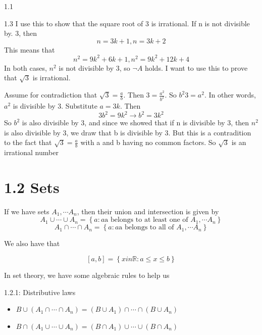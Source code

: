 \documentclass[a4paper,norsk]{article}
\renewcommand{\leq}{\leqslant}
\begin{document}
\begin{oppgavebox}{1.1}{}
\begin{enumerate}
\begin{proofbox}{1.3}{}
    I use this to show that the square root of 3 is irrational. If n is not divisible by. 3, then
    \[
        n =3k+1, n=3k+2
    \]
    This means that 
    \[
        n^2 = 9k^2+6k+1, n^2 =9k^2 + 12k + 4
    \]
    In both cases, $ n^2 $ is not divisible by 3, so $ \neg A $ holds. I want to use this to prove that $ \sqrt{ 3 } $ is irrational.

    Assume for contradiction that $ \sqrt{ 3 } = \frac{ a }{ b } $. Then $ 3 = \frac{ a^2 }{ b^2 } $. So $ b^2 3 = a^2 $. In other words, $ a^2 $ is divisible by 3. Substitute $ a = 3k $. Then
    \[
        3b^2 = 9k^2 \rightarrow b^2 = 3k^2 
    \]
    So $ b^2 $ is also divisible by 3, and since we showed that if n is divisible by 3, then $ n^2 $ is also divisible by 3, we draw that b is divisible by 3. But this is a contradition to the fact that $ \sqrt{ 3 } = \frac{ a }{ b } $  with a and b having no common factors. So $ \sqrt{ 3 } $ is an irrational number
  \end{proofbox}

  \end{enumerate}
\end{oppgavebox}



\section*{1.2 Sets}

If we have sets $ A_1,\cdots A_n $, then their union and intersection is given by  
\[
    A_1 \cup \cdots \cup A_n = \left\{ a : a \text{a belongs to at least one of } A_1, \cdots A_n  \right\} 
\]
\[
    A_1 \cap \cdots \cap A_n = \left\{ a : a \text{a belongs to all of } A_1, \cdots A_n  \right\} 
\]

We also have that

\[
    \left[ a, b \right] = \left\{ x in \mathbb{R} : a \leq x \leq b  \right\}  
\]





In set theory, we have some algebraic rules to help us

\begin{propositionbox}{1.2.1: Distributive laws}{}
\begin{itemize}
  \item $ B \cup \left( A_1 \cap \cdots \cap A_n \right) = \left( B \cup A_1 \right) \cap \cdots \cap \left( B \cup A_n \right)   $ 
  \item $ B \cap \left( A_1 \cup \cdots \cup A_n \right) = \left( B \cap A_1 \right) \cup \cdots \cup \left( B \cap A_n \right)   $ 
\end{itemize}
\end{propositionbox}
\end{document}
